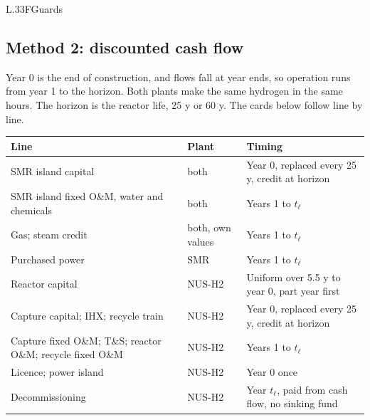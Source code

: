 \begin{eqcard}{L.33}{F}{Guards}
\end{eqcard}

\subsection*{Method 2: discounted cash flow}
Year 0 is the end of construction, and flows fall at year ends, so operation runs from year 1 to the horizon. Both plants make the same hydrogen in the same hours. The horizon is the reactor life, 25 y or 60 y. The cards below follow  line by line.

\begin{center}\small
\begin{tabular}{@{}lll@{}}
\toprule
Line & Plant & Timing\\
\midrule
SMR island capital & both & Year 0, replaced every 25 y, credit at horizon\\
SMR island fixed O\&M, water and chemicals & both & Years 1 to $t_\ell$\\
Gas; steam credit & both, own values & Years 1 to $t_\ell$\\
Purchased power & SMR & Years 1 to $t_\ell$\\
Reactor capital & NUS-H2 & Uniform over 5.5 y to year 0, part year first\\
Capture capital; IHX; recycle train & NUS-H2 & Year 0, replaced every 25 y, credit at horizon\\
Capture fixed O\&M; T\&S; reactor O\&M; recycle fixed O\&M & NUS-H2 & Years 1 to $t_\ell$\\
Licence; power island & NUS-H2 & Year 0 once\\
Decommissioning & NUS-H2 & Year $t_\ell$, paid from cash flow, no sinking fund\\
\bottomrule
\end{tabular}
\end{center}

